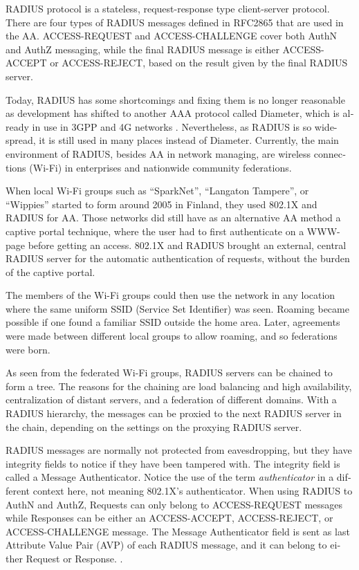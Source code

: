 \documentclass[12pt,a4paper,english]{tutthesis}
\begin{document}
\begin{otherlanguage}{english}
RADIUS protocol is a stateless, request-response type client-server
protocol. 
There are four types of RADIUS messages defined in RFC2865 that are
used in the AA. ACCESS-REQUEST and ACCESS-CHALLENGE cover both AuthN and
AuthZ messaging, while the final RADIUS message is either
ACCESS-ACCEPT or ACCESS-REJECT, based on the
result given by the final RADIUS  server.

Today, RADIUS has some shortcomings and fixing them is no longer
reasonable as development has shifted to another AAA protocol called
Diameter, which is already in use in 3GPP and 4G
networks \cite{diameter}.  Nevertheless, as RADIUS is so wide-spread,
it is still used in many places instead of Diameter.  Currently,
the main environment of RADIUS, besides AA in network managing, are wireless
connections (Wi-Fi) in enterprises and nationwide community
federations.


When local Wi-Fi groups  such as ``SparkNet'', ``Langaton
Tampere'', or ``Wippies'' started to form  around 2005 in Finland, they used
802.1X and RADIUS for AA. Those networks did still have as an
alternative AA method a captive portal technique, where the user had to
first authenticate on a WWW-page before getting an access.  802.1X and
RADIUS brought an external, central RADIUS server for the automatic authentication
of requests, without the burden of the captive portal.

The members of the Wi-Fi groups could then use the network in any location where
the same uniform SSID (Service Set Identifier) was seen. Roaming
became possible if one found a familiar SSID outside the home area.
Later,  agreements were made between different local groups to allow
roaming, and so federations were born.

As seen from the federated Wi-Fi groups, RADIUS servers can be chained to
form a tree. The reasons for the chaining are load balancing and high
availability, centralization of distant servers, and
a federation of different domains. With a RADIUS hierarchy, the messages
can be proxied to the next RADIUS server in the chain, depending on the settings
on the proxying RADIUS server.

RADIUS messages are normally not protected from eavesdropping, but they have
integrity fields to notice if they have been tampered with.
The integrity field is called a Message Authenticator.
Notice the use of the term \emph{authenticator} in a different context here, not
meaning 802.1X's authenticator.
When using RADIUS to AuthN and AuthZ, Requests can only belong to ACCESS-REQUEST messages while
Responses can be either an ACCESS-ACCEPT, ACCESS-REJECT, or ACCESS-CHALLENGE message.
The Message Authenticator field is sent as last Attribute Value Pair (AVP)
of each RADIUS message, and it can belong 
to either Request or Response. \cite[p.20]{radiusbook}.


\end{otherlanguage}
\end{document}
